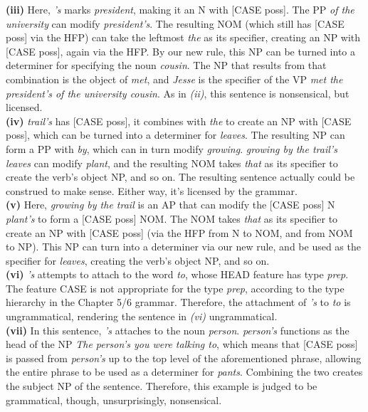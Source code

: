 \documentclass{article}
\begin{document}
\textbf{(iii)} Here, \textit{'s} marks \textit{president}, making it an N with [{\sc CASE} poss]. The PP \textit{of the university} can modify \textit{president's}. The resulting NOM (which still has [{\sc CASE} poss] via the HFP) can take the leftmost \textit{the} as its specifier, creating an NP with [{\sc CASE} poss], again via the HFP. By our new rule, this NP can be turned into a determiner for specifying the noun \textit{cousin}. The NP that results from that combination is the object of \textit{met}, and \textit{Jesse} is the specifier of the VP \textit{met the president's of the university cousin}. As in \textit{(ii)}, this sentence is nonsensical, but licensed.\\

\textbf{(iv)} \textit{trail's} has [{\sc CASE} poss], it combines with \textit{the} to create an NP with [{\sc CASE} poss], which can be turned into a determiner for \textit{leaves}. The resulting NP can form a PP with \textit{by}, which can in turn modify \textit{growing}. \textit{growing by the trail's leaves} can modify \textit{plant}, and the resulting NOM takes \textit{that} as its specifier to create the verb's object NP, and so on. The resulting sentence actually could be construed to make sense. Either way, it's licensed by the grammar.\\

\textbf{(v)} Here, \textit{growing by the trail} is an AP that can modify the [{\sc CASE} poss] N \textit{plant's} to form a [{\sc CASE} poss] NOM. The NOM takes \textit{that} as its specifier to create an NP with [{\sc CASE} poss] (via the HFP from N to NOM, and from NOM to NP). This NP can turn into a determiner via our new rule, and be used as the specifier for \textit{leaves}, creating the verb's object NP, and so on.\\

\textbf{(vi)} \textit{'s} attempts to attach to the word \textit{to}, whose {\sc HEAD} feature has type \textit{prep}. The feature {\sc CASE} is not appropriate for the type \textit{prep}, according to the type hierarchy in the Chapter 5/6 grammar. Therefore, the attachment of \textit{'s} to \textit{to} is ungrammatical, rendering the sentence in \textit{(vi)} ungrammatical.\\

\textbf{(vii)} In this sentence, \textit{'s} attaches to the noun \textit{person}. \textit{person's} functions as the head of the NP \textit{The person's you were talking to}, which means that [{\sc CASE} poss] is passed from \textit{person's} up to the top level of the aforementioned phrase, allowing the entire phrase to be used as a determiner for \textit{pants}. Combining the two creates the subject NP of the sentence. Therefore, this example is judged to be grammatical, though, unsurprisingly, nonsensical.
\end{document}
